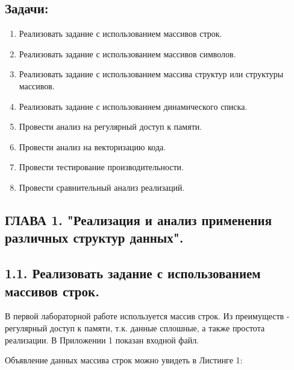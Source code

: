 \documentclass[12pt, a4paper]{report}
\begin{document}
\subsection*{Задачи:}
\begin{enumerate}
    \item Реализовать задание с использованием массивов строк.
    \item Реализовать задание с использованием массивов символов.
    \item Реализовать задание с использованием массива структур или структуры массивов.  
    \item Реализовать задание с использованием динамического списка.
    \item Провести анализ на регулярный доступ к памяти.
    \item Провести анализ на векторизацию кода.
    \item Провести тестирование производительности.
    \item Провести сравнительный анализ реализаций.
\end{enumerate}


\newpage

\begin{center}
\section*{ГЛАВА 1.  "Реализация и анализ применения различных структур данных".}
\subsection*{1.1. Реализовать задание с использованием массивов строк.}
\end{center}

В первой лабораторной работе используется массив строк. Из преимуществ - регулярный доступ к памяти, т.к. данные сплошные, а также простота реализации. В Приложении 1 показан входной файл.

Объявление данных массива строк можно увидеть в Листинге 1:
\end{document}
